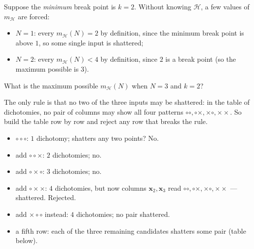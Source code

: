 Suppose the \emph{minimum} break point is \(k = 2\). Without knowing
\(\mathcal{H}\), a few values of \(m_{\mathcal{H}}\) are forced:

\begin{itemize}
    \item \(N = 1\): every \(m_{\mathcal{H}}(N) = 2\) by definition, since the
        minimum break point is above \(1\), so some single input is shattered;
    \item \(N = 2\): every \(m_{\mathcal{H}}(N) < 4\) by definition, since \(2\)
        is a break point (so the maximum possible is \(3\)).
\end{itemize}

\begin{question}\label{q:max-n3-k2}
    What is the maximum possible \(m_{\mathcal{H}}(N)\) when \(N = 3\) and
    \(k = 2\)?
\end{question}

The only rule is that no two of the three inputs may be shattered: in the table
of dichotomies, no pair of columns may show all four patterns
\(\circ\circ, \circ\times, \times\circ, \times\times\). So build the table row
by row and reject any row that breaks the rule.

\begin{itemize}
    \item \(\circ\circ\circ\): \(1\) dichotomy; shatters any two points? No.
    \item add \(\circ\circ\times\): \(2\) dichotomies; no.
    \item add \(\circ\times\circ\): \(3\) dichotomies; no.
    \item add \(\circ\times\times\): \(4\) dichotomies, but now columns
        \(\bm{x}_2, \bm{x}_3\) read \(\circ\circ, \circ\times, \times\circ,
        \times\times\) --- shattered. Rejected.
    \item add \(\times\circ\circ\) instead: \(4\) dichotomies; no pair
        shattered.
    \item a fifth row: each of the three remaining candidates shatters some
        pair (table below).
\end{itemize}

